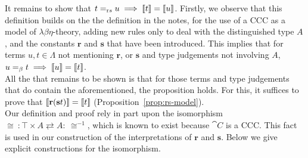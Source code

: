 \begin{prooftree}
\end{prooftree}

It remains to show that ${t =_{\text rs} u\implies \sembrack{t} = \sembrack{u}}$. Firstly, we observe that this definition builds on the the definition in the notes, for the use of a CCC as a model of $\lambda\beta\eta$-theory, adding new rules only to deal with the distinguished type $A$, and the constants $\mathbf{r}$ and $\mathbf{s}$ that have been introduced. This implies that for terms ${u,t\in\Lambda}$ not mentioning $\mathbf{r}$, or $\mathbf{s}$ and type judgements not involving $A$, ${u =_\beta t \implies \sembrack{u} = \sembrack{t}}$.\\[1em]

All the that remains to be shown is that for those terms and type judgements that do contain the aforementioned, the proposition holds. For this, it suffices to prove that $\sembrack{\mathbf{r}(\mathbf{s}t)} = \sembrack{t}$ (Proposition~\ref{prop:rs-model}).\\[1em]

Our definition and proof rely in part upon the isomorphism ${\cong~:\top\times A\rightleftarrows A :~\cong^{-1}}$, which is known to exist because $\cat{C}$ is a CCC. This fact is used in our construction of the interpretations of $\mathbf{r}$ and $\mathbf{s}$. Below we give explicit constructions for the isomorphism.

